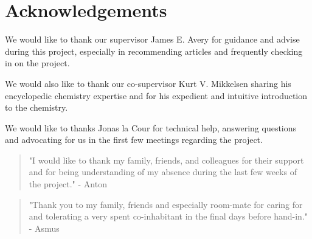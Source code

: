\chapter*{Acknowledgements}
\label{chap:acknowl}

We would like to thank our supervisor James E. Avery for guidance and advise during this project, especially in recommending articles and frequently checking in on the project.

We would also like to thank our co-supervisor Kurt V. Mikkelsen sharing his encyclopedic chemistry expertise and for his expedient and intuitive introduction to the chemistry.

We would like to thanks Jonas la Cour for technical help, answering questions and advocating for us in the first few meetings regarding the project.

\vspace*{\fill} 
\begin{quote} 
\centering 
"I would like to thank my family, friends, and colleagues for their support and for being understanding of my absence during the last few weeks of the project." - Anton
\end{quote}
\vspace*{2em}
\begin{quote} 
\centering 
"Thank you to my family, friends and especially room-mate for caring for and tolerating a very spent co-inhabitant in the final days before hand-in." - Asmus
\end{quote}
\vspace*{\fill}
\vspace*{\fill}
